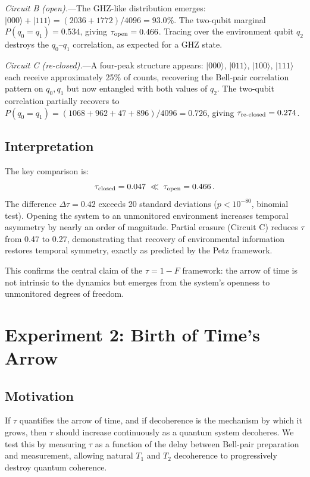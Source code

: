 \documentclass[prl,twocolumn,superscriptaddress,longbibliography,floatfix]{revtex4-2}
\newcommand{\ket}[1]{|#1\rangle}
\newcommand{\tauasym}{\tau}
\begin{document}
\textit{Circuit B (open).}---The GHZ-like distribution emerges:
$\ket{000}+\ket{111} = (2036+1772)/4096 = 93.0\%$.  The two-qubit
marginal $P(q_0{=}q_1) = 0.534$, giving
$\tauasym_{\rm open} = 0.466$.  Tracing over the environment
qubit $q_2$ destroys the $q_0$--$q_1$ correlation, as expected for
a GHZ state.

\textit{Circuit C (re-closed).}---A four-peak structure appears:
$\ket{000}$, $\ket{011}$, $\ket{100}$, $\ket{111}$ each receive
approximately 25\% of counts, recovering the Bell-pair correlation
pattern on $q_0,q_1$ but now entangled with both values of $q_2$.
The two-qubit correlation partially recovers to
$P(q_0{=}q_1) = (1068+962+47+896)/4096 = 0.726$, giving
$\tauasym_{\rm re\text{-}closed} = 0.274$.

\subsection{Interpretation}

The key comparison is:
\begin{equation}
  \tauasym_{\rm closed} = 0.047 \;\ll\;
  \tauasym_{\rm open} = 0.466\,.
\end{equation}
The difference $\Delta\tauasym = 0.42$ exceeds 20 standard
deviations ($p < 10^{-80}$, binomial test).  Opening the system to
an unmonitored environment increases temporal asymmetry by nearly an
order of magnitude.  Partial erasure (Circuit C) reduces $\tauasym$
from 0.47 to 0.27, demonstrating that recovery of environmental
information restores temporal symmetry, exactly as predicted by the
Petz framework.

This confirms the central claim of the $\tauasym = 1 - F$
framework: the arrow of time is not intrinsic to the dynamics but
emerges from the system's openness to unmonitored degrees of
freedom.

\section{Experiment 2: Birth of Time's Arrow}
\label{sec:birth}

\subsection{Motivation}

If $\tauasym$ quantifies the arrow of time, and if decoherence is the
mechanism by which it grows, then $\tauasym$ should increase
continuously as a quantum system decoheres.  We test this by
measuring $\tauasym$ as a function of the delay between Bell-pair
preparation and measurement, allowing natural $T_1$ and $T_2$
decoherence to progressively destroy quantum coherence.
\end{document}

